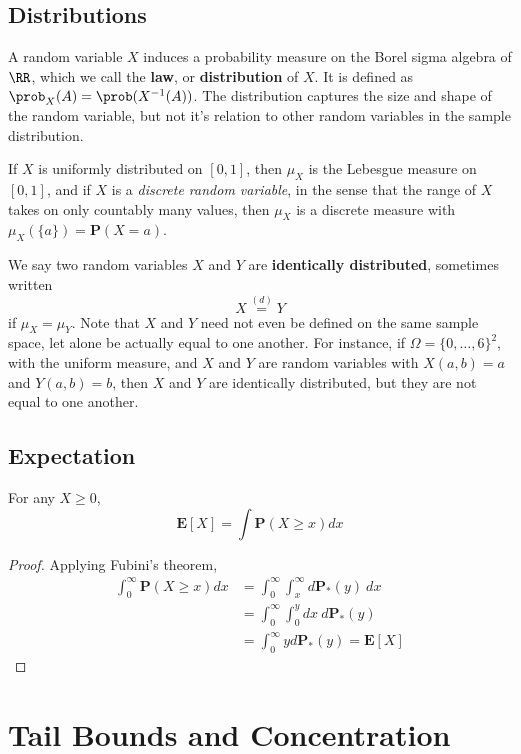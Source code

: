 \section{Distributions}

A random variable $X$ induces a probability measure on the Borel sigma algebra of $\RR$, which we call the {\bf law}, or {\bf distribution} of $X$. It is defined as $\prob_X(A) = \prob(X^{-1}(A))$. The distribution captures the size and shape of the random variable, but not it's relation to other random variables in the sample distribution.

If $X$ is uniformly distributed on $[0,1]$, then $\mu_X$ is the Lebesgue measure on $[0,1]$, and if $X$ is a {\it discrete random variable}, in the sense that the range of $X$ takes on only countably many values, then $\mu_X$ is a discrete measure with $\mu_X(\{ a \}) = \mathbf{P}(X = a)$.

We say two random variables $X$ and $Y$ are {\bf identically distributed}, sometimes written
%
\[ X \overset{(d)}{=} Y \]
%
if $\mu_X = \mu_Y$. Note that $X$ and $Y$ need not even be defined on the same sample space, let alone be actually equal to one another. For instance, if $\Omega = \{ 0, \dots, 6 \}^2$, with the uniform measure, and $X$ and $Y$ are random variables with $X(a,b) = a$ and $Y(a,b) = b$, then $X$ and $Y$ are identically distributed, but they are not equal to one another.

\section{Expectation}

\begin{theorem}
    For any $X \geq 0$,
    \[ \mathbf{E}[X] = \int \mathbf{P}(X \geq x) dx \]
\end{theorem}
\begin{proof}
    Applying Fubini's theorem,
    \begin{align*}
        \int_0^\infty \mathbf{P}(X \geq x) dx &= \int_0^\infty \int_x^\infty d \mathbf{P}_*(y)\ dx\\
        &= \int_0^\infty \int_0^y dx\ d\mathbf{P}_*(y)\\
        &= \int_0^\infty y d\mathbf{P}_*(y) = \mathbf{E}[X]
    \end{align*}
\end{proof}

\chapter{Tail Bounds and Concentration}

